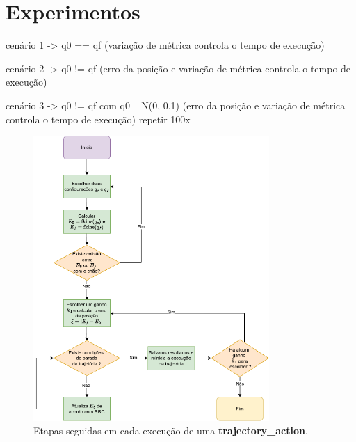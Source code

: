 \section{Experimentos}

cenário 1 -> q0 == qf (variação de métrica controla o tempo de execução)

cenário 2 -> q0 != qf (erro da posição e variação de métrica controla o tempo
de execução)

cenário 3 -> q0 != qf com q0 ~ N(0, 0.1) (erro da posição e variação de métrica
controla o tempo de execução) repetir 100x

\begin{figure}
    \centering
    \includegraphics[width=0.8\textwidth]{./Images/exp-flow.png}
    \caption{Etapas seguidas em cada execução de uma \textbf{trajectory\_action}.}\label{fig:exp-flow}
\end{figure}

